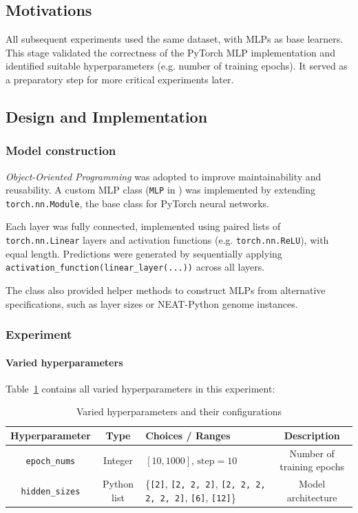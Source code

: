 \documentclass{article}
\begin{document}
\subsection{Motivations}
All subsequent experiments used the same dataset, with MLPs as base learners. This stage validated the correctness of the PyTorch MLP implementation and identified suitable hyperparameters (e.g. number of training epochs). 
It served as a preparatory step for more critical experiments later. 


\subsection{Design and Implementation}


\subsubsection{Model construction}
\textit{Object-Oriented Programming} was adopted to improve maintainability and reusability. A custom MLP class (\texttt{MLP} in ) was implemented by extending \texttt{torch.nn.Module}, the base class for PyTorch neural networks. 

Each layer was fully connected, implemented using paired lists of \texttt{torch.nn.Linear} layers and activation functions (e.g. \texttt{torch.nn.ReLU}), with equal length. Predictions were generated by sequentially applying \texttt{activation\_function(linear\_layer(...))} across all layers. 

The class also provided helper methods to construct MLPs from alternative specifications, such as layer sizes or NEAT-Python genome instances. 


\subsubsection{Experiment}
\paragraph{Varied hyperparameters}
Table~\ref{table:experiment_1_varied_hyperparameters} contains all varied hyperparameters in this experiment: 

\begin{table}[H]
    \centering
    \begin{tabular}{|c|c|p{5cm}|c|}
        \hline
        Hyperparameter & Type & Choices / Ranges & Description \\
        \hline
        \small\texttt{epoch\_nums} & Integer & $[10, 1000]\text{, step}=10$ & Number of training epochs \\
        \hline
        \small\texttt{hidden\_sizes} & Python list & \{\texttt{[2]}, \texttt{[2, 2, 2]}, \texttt{[2, 2, 2, 2, 2, 2]}, \texttt{[6]}, \texttt{[12]}\} & Model architecture \\
        \hline
    \end{tabular}
    \caption{Varied hyperparameters and their configurations}
    \label{table:experiment_1_varied_hyperparameters}
\end{table}
\end{document}
